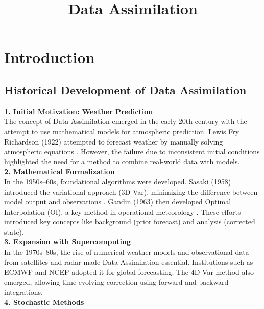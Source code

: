 \documentclass[a4paper]{article}
\date{}
\title{\bfseries\Large{Data Assimilation}}
\begin{document}
\maketitle 

\section{Introduction}

\subsection{Historical Development of Data Assimilation}

\textbf{1. Initial Motivation: Weather Prediction}\\

The concept of Data Assimilation emerged in the early 20th century with the attempt to use mathematical 
models for atmospheric prediction. Lewis Fry Richardson (1922) attempted to forecast weather by manually 
solving atmospheric equations \parencite{richardson1922weather}. However, the failure due to inconsistent 
initial conditions highlighted the need for a method to combine real-world data with models.\\

\textbf{2. Mathematical Formalization}\\

In the 1950s–60s, foundational algorithms were developed. Sasaki (1958) introduced the variational approach 
(3D-Var), minimizing the difference between model output and observations \parencite{sasaki1958objective}. 
Gandin (1963) then developed Optimal Interpolation (OI), a key method in operational meteorology 
\parencite{gandin1963objective}. These efforts introduced key concepts like background (prior forecast) and 
analysis (corrected state).\\

\textbf{3. Expansion with Supercomputing}\\

In the 1970s–80s, the rise of numerical weather models and observational data from satellites and radar 
made Data Assimilation essential. Institutions such as ECMWF and NCEP adopted it for global forecasting. 
The 4D-Var method also emerged, allowing time-evolving correction using forward and backward integrations.\\

\textbf{4. Stochastic Methods}\\
\end{document}
